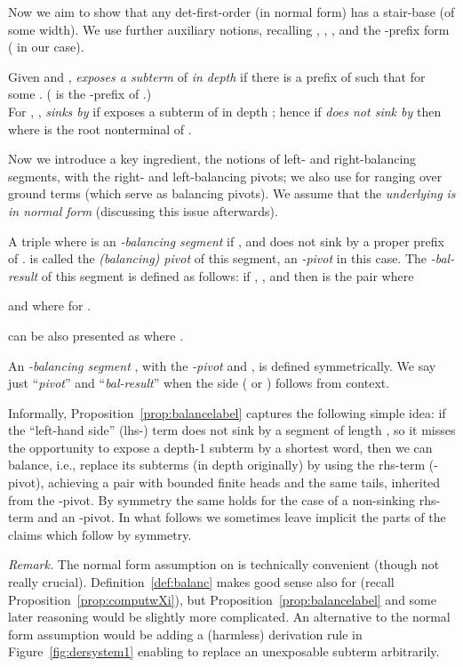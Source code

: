 \documentclass[12pt]{article}
\begin{document}
\noindent
Now we aim to show that any det-first-order
 (in normal form)
has a stair-base (of some width).
We use further auxiliary notions,
recalling 
,
, , and the -prefix form ( in our case).
 
 \begin{defn}\label{def:exposing}
Given  and ,  \emph{exposes a
subterm} of  \emph{in depth}  if there is a prefix  of  such that 
 for some . ( is the -prefix of .)
\\
For  , , 
 \emph{sinks by}  if 
 exposes a subterm of  in depth ; hence if  
 \emph{does not sink by} 
 then
 where
 is the root nonterminal of .
\end{defn}
Now we introduce a key ingredient,
the notions of left- and right-balancing segments, with the right- and
left-balancing pivots; we also use  for ranging over ground terms
(which serve as balancing pivots). We assume that
the \emph{underlying}
 \emph{is in normal form} (discussing this issue afterwards).

\begin{defn}\label{def:balanc}
A triple  where  is an \emph{-balancing
segment} if ,  and 
 does not sink by a proper prefix of .  is called the
\emph{(balancing) pivot} of this segment, an \emph{-pivot}
in this case. 
The \emph{-bal-result}  
of this segment 
is defined
as follows: if ,
, and 
 then 
 is the pair  where
  
and
 where 
for .

can be also presented as 
 where
.

An \emph{-balancing segment} , with the \emph{-pivot} 
and , is
defined symmetrically. We say just ``\emph{pivot}'' and
``\emph{bal-result}'' when
the side ( or ) follows from context.
\end{defn}
Informally, Proposition~\ref{prop:balancelabel} 
captures the following simple idea:
if the ``left-hand side'' (lhs-) term does not sink 
by a segment of length
, so it misses the opportunity to expose
a depth-1 subterm by a shortest word, 
then we can balance, i.e., replace its subterms (in depth 
originally) by using the
rhs-term (-pivot), achieving
a pair with bounded finite heads and the
same tails, inherited from the -pivot.
By symmetry the same holds for the case of
a non-sinking rhs-term and an -pivot.
In what follows we sometimes 
leave implicit the parts of the claims which follow by
symmetry. 

\emph{Remark.}
The normal form assumption on  is technically convenient
(though not really crucial). 
Definition~\ref{def:balanc} makes good sense also for
 (recall Proposition~\ref{prop:computwXi}),
but Proposition~\ref{prop:balancelabel} and some later reasoning
would be slightly more complicated. An alternative to the normal
form assumption would 
be adding
a (harmless)
derivation rule in Figure~\ref{fig:dersystem1} 
enabling to replace
an unexposable subterm arbitrarily.
\end{document}
